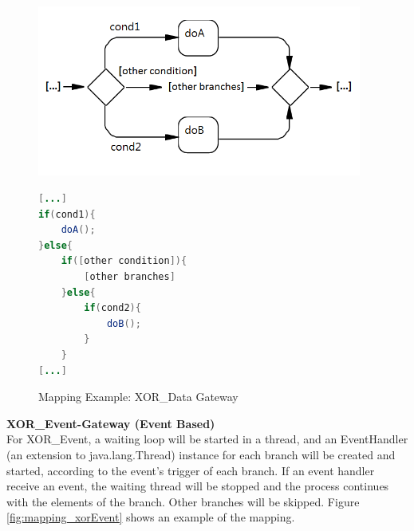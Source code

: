 \begin{figure}[h]
\begin{minipage}[c]{0.5\textwidth}
\includegraphics[width=0.95\textwidth]{images/mapping/xor-data.png}
\end{minipage}
\begin{minipage}[c]{0.5\textwidth}
\begin{lstlisting}[language=Java]
[...]
if(cond1){
	doA();
}else{
	if([other condition]){
		[other branches]
	}else{
		if(cond2){
			doB();
		}
	}
[...]
\end{lstlisting}
\end{minipage}
\caption{Mapping Example: XOR\_Data Gateway}%
\label{fig:mapping_xorData}%
\end{figure}

\textbf{XOR\_Event-Gateway (Event Based)}\\
For XOR\_Event, a waiting loop will be started in a thread, and an EventHandler (an extension to java.lang.Thread) instance for each branch will be created and started, according to the event's trigger of each branch. If an event handler receive an event, the waiting thread will be stopped  and the process continues with the elements of the branch. Other branches will be skipped. Figure \ref{fig:mapping_xorEvent} shows an example of the mapping.

